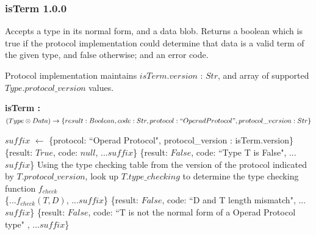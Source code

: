 \documentclass[9pt, oneside]{article}   	%
\begin{document}
\subsubsection{isTerm 1.0.0}\label{isTerm_code}

Accepts a type in its normal form, and a data blob. Returns a boolean which is true if the protocol implementation could determine that data is a valid term of the given type, and false otherwise; and an error code.

Protocol implementation maintains $isTerm.version$ : $Str$, and array of supported $Type.protocol\_version$ values.

\vspace{.25 cm}
\begin{algorithm}[H]
\setcounter{AlgoLine}{0}
\caption{\textbf{isTerm : \\ $(Type \otimes Data) \rightarrow \{result: Boolean, code: Str, protocol: ``Operad Protocol", protocol\_version : Str\}$}}
\label{algo_isTerm}
\label{alg:quad}
\SetAlgoLined
$suffix$ $\leftarrow$ \{protocol: ``Operad Protocol", protocol\_version : isTerm.version\} \\
 {
	\Return \{result: $True$, code: $null$, ...$suffix$\}
	}
{
	\Return \{result: $False$, code: ``Type T is False", ...$suffix$\}
}
	{
		Using the type checking table from the version of the protocol indicated by $T.protocol\_version$, look up $T.type\_checking$ to determine the type checking function $f_{check}$\\
    		\Return \{...$f_{check}(T, D)$, ...$suffix$\}
	}
{
	{
		\Return \{result: $False$, code: ``D and T length mismatch", ...$suffix$\}
	}
    }
\Else
{
	\Return \{result: $False$, code: ``T is not the normal form of a Operad Protocol type" , ...$suffix$\}\
}
\end{algorithm}
\end{document}
